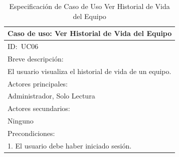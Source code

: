 \documentclass[stu, 12pt, letterpaper, donotrepeattitle, floatsintext, natbib]{apa7}
\begin{document}
\begin{longtable}{@{} p{16.5cm} @{}}
    \caption{Especificaci\'on de Caso de Uso Ver Historial de Vida del Equipo}\label{tab:UC06}                                                                                             \\ \toprule
    \multicolumn{1}{c}{Caso de uso: Ver Historial de Vida del Equipo}                                                                                                                      \\ \midrule
    ID:~UC06                                                                                                                                                                               \\ \midrule
    Breve descripci\'on:                                                                                                                                                                   \\
    El usuario visualiza el historial de vida de un equipo.                                                                                                                                \\ \midrule
    Actores principales:                                                                                                                                                                   \\
    Administrador, Solo Lectura                                                                                                                                                            \\ \midrule
    Actores secundarios:                                                                                                                                                                   \\
    Ninguno                                                                                                                                                                                \\ \midrule
    Precondiciones:                                                                                                                                                                        \\
    1. El usuario debe haber iniciado sesi\'on.                                                                                                                                            \\ \midrule

\end{longtable}
\end{document}
